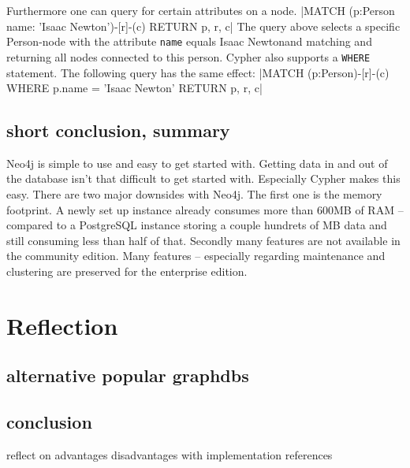 Furthermore one can query for certain attributes on a node.
|MATCH (p:Person {name: 'Isaac Newton'})-[r]-(c) RETURN p, r, c|
The query above selects a specific Person-node with the attribute \texttt{name} equals \glqq Isaac Newton\grqq and matching and returning all nodes connected to this person.
Cypher also supports a \texttt{WHERE} statement. The following query has the same effect: |MATCH (p:Person)-[r]-(c) WHERE p.name = 'Isaac Newton' RETURN p, r, c|


\subsection{short conclusion, summary}
Neo4j is simple to use and easy to get started with.
Getting data in and out of the database isn't that difficult to get started with.
Especially Cypher makes this easy.
There are two major downsides with Neo4j. The first one is the memory footprint.
A newly set up instance already consumes more than 600MB of RAM -- compared to a PostgreSQL instance storing a couple hundrets of MB data and still consuming less than half of that.
Secondly many features are not available in the community edition.
Many features -- especially regarding maintenance and clustering are preserved for the enterprise edition.


\section{Reflection}
\subsection{alternative popular graphdbs}
\subsection{conclusion}
reflect on advantages disadvantages with implementation references

